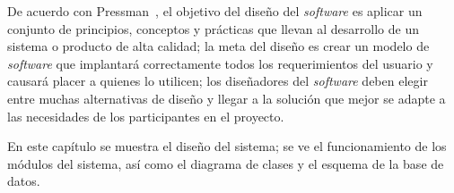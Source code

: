 De acuerdo con Pressman~\cite{pressman_software_2005}, el objetivo del diseño del \textit{software} es aplicar un conjunto de principios, conceptos y prácticas que llevan al desarrollo de un sistema o producto de alta calidad; la meta del diseño es crear un modelo de \textit{software} que implantará correctamente todos los requerimientos del usuario y causará placer a quienes lo utilicen; los diseñadores del \textit{software} deben elegir entre muchas alternativas de diseño y llegar a la solución que mejor se adapte a las necesidades de
los participantes en el proyecto.


En este capítulo se muestra el diseño del sistema; se ve el funcionamiento de los módulos del sistema, así como el diagrama de clases y el esquema de la base de datos.




%

